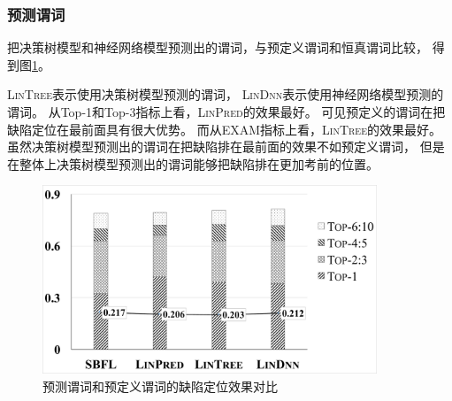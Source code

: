 \subsubsection{预测谓词}

把决策树模型和神经网络模型预测出的谓词，与预定义谓词和恒真谓词比较，
得到图\ref{fig:diff-ml-pred-compare}。

\textsc{LinTree}表示使用决策树模型预测的谓词，
\textsc{LinDnn}表示使用神经网络模型预测的谓词。
从Top-1和Top-3指标上看，\textsc{LinPred}的效果最好。
可见预定义的谓词在把缺陷定位在最前面具有很大优势。
而从EXAM指标上看，\textsc{LinTree}的效果最好。
虽然决策树模型预测出的谓词在把缺陷排在最前面的效果不如预定义谓词，
但是在整体上决策树模型预测出的谓词能够把缺陷排在更加考前的位置。


\begin{figure}[htbp] 
\centering 
\includegraphics[width=10cm]{figure/diff-ml-pred-compare} 
\caption{预测谓词和预定义谓词的缺陷定位效果对比} 
\label{fig:diff-ml-pred-compare}
\end{figure}

